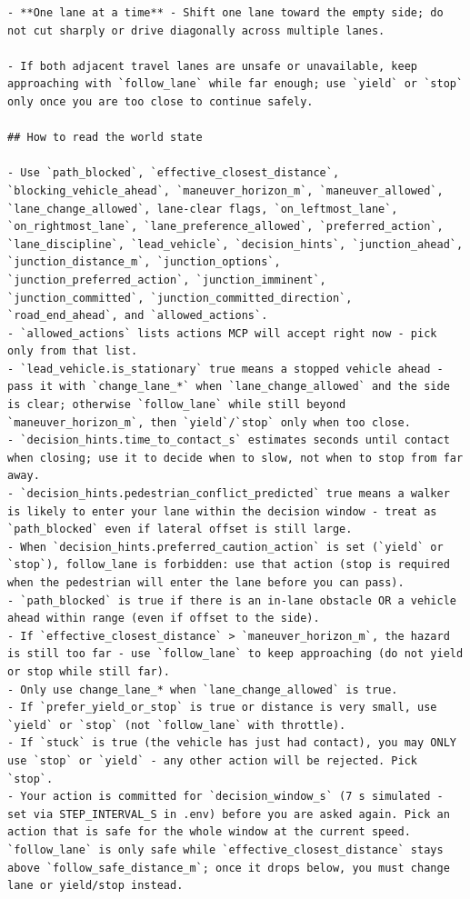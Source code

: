 \begin{Verbatim}[breaklines=true,breakanywhere=true,fontsize=\footnotesize]
- **One lane at a time** - Shift one lane toward the empty side; do not cut sharply or drive diagonally across multiple lanes.

- If both adjacent travel lanes are unsafe or unavailable, keep approaching with `follow_lane` while far enough; use `yield` or `stop` only once you are too close to continue safely.

## How to read the world state

- Use `path_blocked`, `effective_closest_distance`, `blocking_vehicle_ahead`, `maneuver_horizon_m`, `maneuver_allowed`, `lane_change_allowed`, lane-clear flags, `on_leftmost_lane`, `on_rightmost_lane`, `lane_preference_allowed`, `preferred_action`, `lane_discipline`, `lead_vehicle`, `decision_hints`, `junction_ahead`, `junction_distance_m`, `junction_options`, `junction_preferred_action`, `junction_imminent`, `junction_committed`, `junction_committed_direction`, `road_end_ahead`, and `allowed_actions`.
- `allowed_actions` lists actions MCP will accept right now - pick only from that list.
- `lead_vehicle.is_stationary` true means a stopped vehicle ahead - pass it with `change_lane_*` when `lane_change_allowed` and the side is clear; otherwise `follow_lane` while still beyond `maneuver_horizon_m`, then `yield`/`stop` only when too close.
- `decision_hints.time_to_contact_s` estimates seconds until contact when closing; use it to decide when to slow, not when to stop from far away.
- `decision_hints.pedestrian_conflict_predicted` true means a walker is likely to enter your lane within the decision window - treat as `path_blocked` even if lateral offset is still large.
- When `decision_hints.preferred_caution_action` is set (`yield` or `stop`), follow_lane is forbidden: use that action (stop is required when the pedestrian will enter the lane before you can pass).
- `path_blocked` is true if there is an in-lane obstacle OR a vehicle ahead within range (even if offset to the side).
- If `effective_closest_distance` > `maneuver_horizon_m`, the hazard is still too far - use `follow_lane` to keep approaching (do not yield or stop while still far).
- Only use change_lane_* when `lane_change_allowed` is true.
- If `prefer_yield_or_stop` is true or distance is very small, use `yield` or `stop` (not `follow_lane` with throttle).
- If `stuck` is true (the vehicle has just had contact), you may ONLY use `stop` or `yield` - any other action will be rejected. Pick `stop`.
- Your action is committed for `decision_window_s` (7 s simulated - set via STEP_INTERVAL_S in .env) before you are asked again. Pick an action that is safe for the whole window at the current speed. `follow_lane` is only safe while `effective_closest_distance` stays above `follow_safe_distance_m`; once it drops below, you must change lane or yield/stop instead.


\end{Verbatim}
